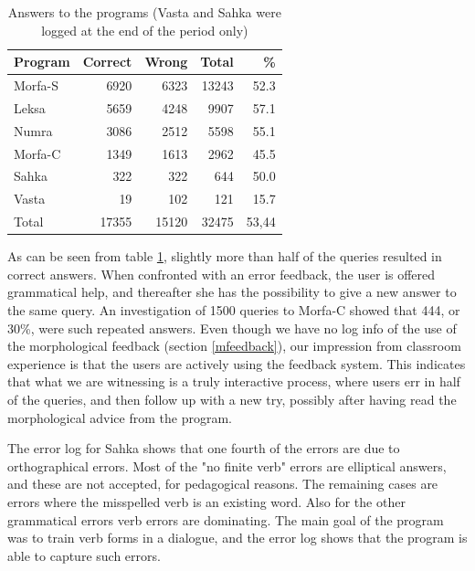 \documentclass[11pt]{article}
\begin{document}
\begin{table}[htdp]
\caption{Answers to the programs (Vasta and Sahka were logged at the end of the period only)}
\begin{center}
\begin{tabular}{|l|r|r|r|r|}
\hline
Program     & Correct &   Wrong &    Total &  \% \\
\hline									 
Morfa-S  &  6920   & 6323    & 13243    & 52.3 \\
Leksa    &  5659   & 4248    & 9907	    & 57.1  \\
Numra    &  3086   & 2512    & 5598	    & 55.1  \\
Morfa-C  &  1349   & 1613    & 2962	    & 45.5  \\
Sahka    &   322   &   322   &  644	    & 50.0  \\
Vasta    &   19    &   102   &  121	    & 15.7 \\
\hline
Total   & 17355  &  15120  &  32475  &  53,44\\
\hline
\end{tabular}
\end{center}
\label{log1}
\end{table}


As can be seen from table \ref{log1}, slightly more than half of the queries resulted in correct answers. When confronted with an error feedback, the user is offered grammatical help, and thereafter she has the possibility to give a new answer to the same query. An investigation of 1500 queries to Morfa-C showed that 444, or 30\%, were such repeated answers. Even though we have no log info of the use of the morphological feedback (section \ref{mfeedback}), our impression from classroom experience is that the users are actively using the feedback system. This indicates that what we are witnessing is a truly interactive process, where users err in half of the queries, and then follow up with a new try, possibly after having read the morphological advice from the program.

The error log for Sahka shows that one fourth of the errors are due to orthographical errors. Most of the "no finite verb" errors are elliptical answers, and these are not accepted, for pedagogical reasons. The remaining cases are errors where the misspelled verb is an existing word. Also for the other grammatical errors verb errors are dominating. The main goal of the program was to train verb forms in a dialogue, and the error log shows that the program is able to capture such errors.
\end{document}
